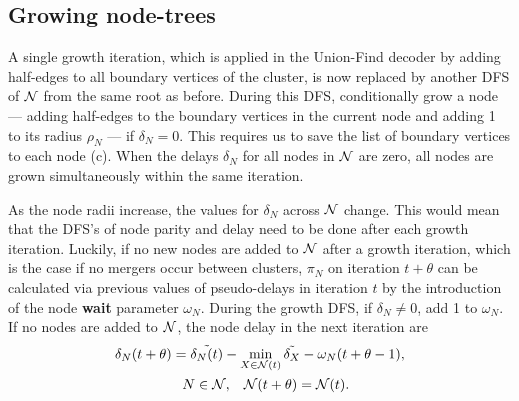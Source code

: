 \subsection{Growing node-trees}\label{sec:grownodetrees}

A single growth iteration, which is applied in the Union-Find decoder by adding half-edges to all boundary vertices of the cluster, is now replaced by another DFS of $\mathcal{N}$ from the same root as before. During this DFS, conditionally grow a node --- adding half-edges to the boundary vertices in the current node and adding 1 to its radius $\rho_N$ --- if $\delta_N = 0$. This requires us to save the list of boundary vertices to each node (c). When the delays $\delta_N$ for all nodes in $\mathcal{N}$ are zero, all nodes are grown simultaneously within the same iteration. 

As the node radii increase, the values for $\delta_N$ across $\mathcal{N}$ change. This would mean that the DFS's of node parity and delay need to be done after each growth iteration. Luckily, if no new nodes are added to $\mathcal{N}$ after a growth iteration, which is the case if no mergers occur between clusters, $\pi_N$ on iteration $t+\theta$ can be calculated via previous values of pseudo-delays in iteration $t$ by the introduction of the node \textbf{wait} parameter $\omega_N$. During the growth DFS, if $\delta_N \neq 0$, add 1 to $\omega_N$. If no nodes are added to $\mathcal{N}$, the node delay in the next iteration are
\begin{multline}\label{eq:delay}
    \delta_N(t+\theta) = \tilde{\delta_N(t)} - \min_{X \in \mathcal{N}(t)}{\tilde{\delta_X}} - \omega_N(t+\theta-1),  \\
    \hspace{.3cm} N \in \mathcal{N}, \hspace{.3cm} \mathcal{N}(t+\theta) = \mathcal{N}(t).  
\end{multline}



